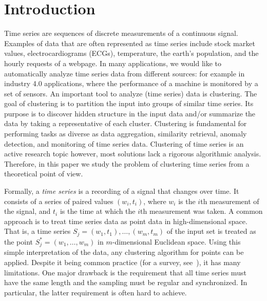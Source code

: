 \documentclass[11pt, letter]{article}
\begin{document}
\section{Introduction}

Time series are sequences of discrete measurements of a continuous signal. Examples of data that are often represented as time series include stock market values, electrocardiograms (ECGs), temperature, the earth's population, and the hourly requests of a webpage. In many applications, we would like to automatically analyze time series data from different sources: for example in industry 4.0 applications, where the performance of a machine is monitored by a set of sensors. An important tool to analyze (time series) data is clustering. The goal of clustering is to partition the input into groups of similar time series. Its purpose is to discover hidden structure in the input data and/or summarize the data by taking a representative of each cluster.  Clustering is fundamental for performing tasks as diverse as data aggregation, similarity retrieval, anomaly detection, and monitoring of time series data.  Clustering of time series is an active research topic
\cite{
ar-dcaa-2013,
Boecking2014129,
cmp-fcis-07, 
Hsu2014358,
jp-fdc-13,
Li2013243,
liao05survey,
tc-sbc-12,
Petitjean2011678,
rm-fcbwm-06, 
sf-mpfa-14,
hd-tsc-14,
wsh-cbc-06,
zt-MODIS-14,
qg-nadtw-12}
however, most solutions lack a rigorous algorithmic analysis. Therefore, in this paper we study the problem of clustering time series from a theoretical point of view. 


Formally, a \emph{time series} is a recording of a signal that changes over time. It consists of a series of paired values $(w_i,t_i)$, where $w_i$ is the $i$th measurement of the signal, and $t_i$ is the time at which the $i$th measurement
was taken. A common approach is to treat time series data as point data in high-dimensional space.  That is, a time series
$S_j=(w_1,t_1),\dots,(w_m,t_m)$ of the input set is treated as the point
$S^{*}_j=(w_1,\dots,w_m)$ in $m$-dimensional Euclidean space. Using this simple interpretation of the data, any clustering algorithm for points can be applied. Despite it being common practice (for a survey, see~\cite{liao05survey}), it has many limitations. 
One major drawback is the requirement that all time series must have the same length and the sampling must be regular and synchronized. In particular, the latter requirement is often hard to achieve. 
\end{document}
